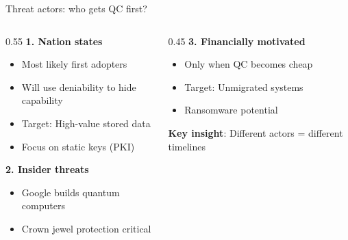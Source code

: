\ifdefined\PRESENTATION\else\PassOptionsToClass{handout}{beamer}\fi\documentclass[aspectratio=169, lualatex]{beamer}
\begin{document}
\begin{frame}{Threat actors: who gets QC first?}
	\begin{columns}[c]
		\begin{column}{0.55\textwidth}
			\textbf{1. Nation states}
			\begin{itemize}
				\item Most likely first adopters
				\item Will use deniability to hide capability
				\item Target: High-value stored data
				\item Focus on static keys (PKI)
			\end{itemize}
			\textbf{2. Insider threats}
			\begin{itemize}
				\item Google builds quantum computers
				\item Crown jewel protection critical
			\end{itemize}
		\end{column}
		\begin{column}{0.45\textwidth}
			\textbf{3. Financially motivated}
			\begin{itemize}
				\item Only when QC becomes cheap
				\item Target: Unmigrated systems
				\item Ransomware potential
			\end{itemize}
			\vspace{5mm}
			\textbf{Key insight}: Different actors = different timelines
		\end{column}
	\end{columns}
\end{frame}
\end{document}

